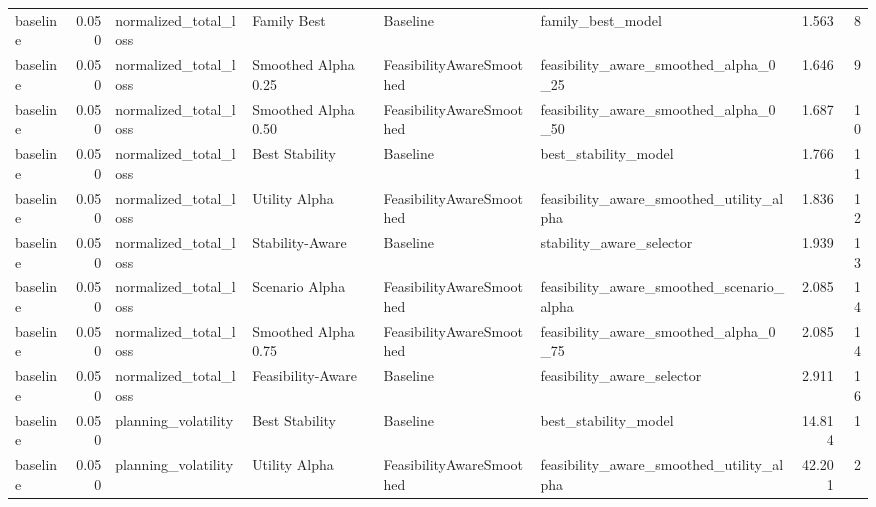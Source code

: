 \begin{table}
{\begin{tabular}{lrllllrr}
      baseline &             0.050 &       normalized\_total\_loss &           Family Best &                  Baseline &                                  family\_best\_model &         1.563 &               8 \\
      baseline &             0.050 &       normalized\_total\_loss &   Smoothed Alpha 0.25 &  FeasibilityAwareSmoothed &              feasibility\_aware\_smoothed\_alpha\_0\_25 &         1.646 &               9 \\
      baseline &             0.050 &       normalized\_total\_loss &   Smoothed Alpha 0.50 &  FeasibilityAwareSmoothed &              feasibility\_aware\_smoothed\_alpha\_0\_50 &         1.687 &              10 \\
      baseline &             0.050 &       normalized\_total\_loss &        Best Stability &                  Baseline &                               best\_stability\_model &         1.766 &              11 \\
      baseline &             0.050 &       normalized\_total\_loss &         Utility Alpha &  FeasibilityAwareSmoothed &           feasibility\_aware\_smoothed\_utility\_alpha &         1.836 &              12 \\
      baseline &             0.050 &       normalized\_total\_loss &       Stability-Aware &                  Baseline &                           stability\_aware\_selector &         1.939 &              13 \\
      baseline &             0.050 &       normalized\_total\_loss &        Scenario Alpha &  FeasibilityAwareSmoothed &          feasibility\_aware\_smoothed\_scenario\_alpha &         2.085 &              14 \\
      baseline &             0.050 &       normalized\_total\_loss &   Smoothed Alpha 0.75 &  FeasibilityAwareSmoothed &              feasibility\_aware\_smoothed\_alpha\_0\_75 &         2.085 &              14 \\
      baseline &             0.050 &       normalized\_total\_loss &     Feasibility-Aware &                  Baseline &                         feasibility\_aware\_selector &         2.911 &              16 \\
      baseline &             0.050 &         planning\_volatility &        Best Stability &                  Baseline &                               best\_stability\_model &        14.814 &               1 \\
      baseline &             0.050 &         planning\_volatility &         Utility Alpha &  FeasibilityAwareSmoothed &           feasibility\_aware\_smoothed\_utility\_alpha &        42.201 &               2 \\

\end{tabular}}
\end{table}
